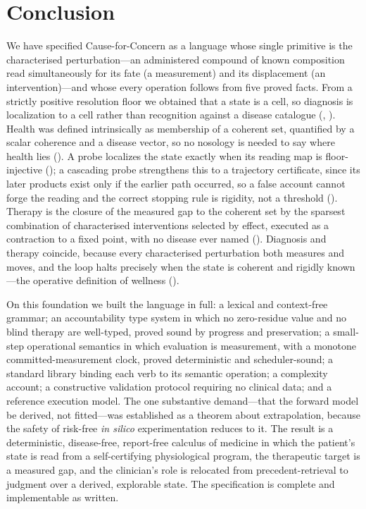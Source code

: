 \documentclass[11pt,a4paper]{article}
\theoremstyle{cfcthm}
\theoremstyle{definition}
\theoremstyle{remark}
\begin{document}
\section{Conclusion}
\label{sec:conclusion}

We have specified Cause-for-Concern as a language whose single primitive is the
characterised perturbation---an administered compound of known composition read
simultaneously for its fate (a measurement) and its displacement (an
intervention)---and whose every operation follows from five proved facts. From a
strictly positive resolution floor we obtained that a state is a cell, so
diagnosis is localization to a cell rather than recognition against a disease
catalogue (, ). Health was defined intrinsically
as membership of a coherent set, quantified by a scalar coherence and a disease
vector, so no nosology is needed to say where health lies
(). A probe localizes the state exactly when its reading map
is floor-injective (); a cascading probe strengthens this
to a trajectory certificate, since its later products exist only if the earlier
path occurred, so a false account cannot forge the reading and the correct
stopping rule is rigidity, not a threshold ().
Therapy is the closure of the measured gap to the coherent set by the sparsest
combination of characterised interventions selected by effect, executed as a
contraction to a fixed point, with no disease ever named
(). Diagnosis and therapy coincide, because
every characterised perturbation both measures and moves, and the loop halts
precisely when the state is coherent and rigidly known---the operative
definition of wellness ().

On this foundation we built the language in full: a lexical and context-free
grammar; an accountability type system in which no zero-residue value and no
blind therapy are well-typed, proved sound by progress and preservation; a
small-step operational semantics in which evaluation is measurement, with a
monotone committed-measurement clock, proved deterministic and scheduler-sound;
a standard library binding each verb to its semantic operation; a complexity
account; a constructive validation protocol requiring no clinical data; and a
reference execution model. The one substantive demand---that the forward model
be derived, not fitted---was established as a theorem about extrapolation,
because the safety of risk-free \emph{in silico} experimentation reduces to it.
The result is a deterministic, disease-free, report-free calculus of medicine in
which the patient's state is read from a self-certifying physiological program,
the therapeutic target is a measured gap, and the clinician's role is relocated
from precedent-retrieval to judgment over a derived, explorable state. The
specification is complete and implementable as written.
\end{document}
